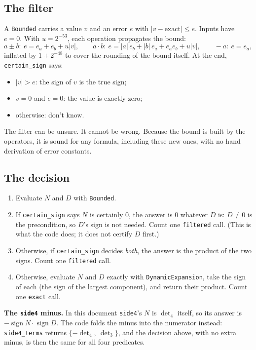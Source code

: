 \documentclass[11pt,a4paper]{article}
\newcommand{\code}[1]{\texttt{#1}}
\newcommand{\sgn}{\operatorname{sign}}
\theoremstyle{remark}
\begin{document}
\subsection{The filter}

A \code{Bounded} carries a value $v$ and an error $e$ with $|v - \text{exact}| \le e$. Inputs
have $e = 0$. With $u = 2^{-53}$, each operation propagates the bound:
\[
  a \pm b:\ e = e_a + e_b + u|v|, \qquad
  a\cdot b:\ e = |a|\,e_b + |b|\,e_a + e_a e_b + u|v|, \qquad
  -a:\ e = e_a,
\]
inflated by $1 + 2^{-48}$ to cover the rounding of the bound itself. At the end,
\code{certain\_sign} says:
\begin{itemize}
  \item $|v| > e$: the sign of $v$ is the true sign;
  \item $v = 0$ and $e = 0$: the value is exactly zero;
  \item otherwise: don't know.
\end{itemize}
The filter can be unsure. It cannot be wrong. Because the bound is built by the operators, it is
sound for any formula, including these new ones, with no hand derivation of error constants.

\subsection{The decision}

\begin{enumerate}
  \item Evaluate $N$ and $D$ with \code{Bounded}.
  \item If \code{certain\_sign} says $N$ is certainly 0, the answer is 0 whatever $D$ is: $D \neq 0$
    is the precondition, so $D$'s sign is not needed. Count one \code{filtered} call. (This is
    what the code does; it does not certify $D$ first.)
  \item Otherwise, if \code{certain\_sign} decides \emph{both}, the answer is the product of the
    two signs. Count one \code{filtered} call.
  \item Otherwise, evaluate $N$ and $D$ exactly with \code{DynamicExpansion}, take the sign of each
    (the sign of the largest component), and return their product. Count one \code{exact} call.
\end{enumerate}
\noindent\textbf{The \code{side4} minus.} In this document \code{side4}'s $N$ is $\det_4$ itself,
so its answer is $-\sgn N\cdot\sgn D$. The code folds the minus into the numerator instead:
\code{side4\_terms} returns $\{-\det_4,\ \det_3\}$, and the decision above, with no extra minus,
is then the same for all four predicates.
\end{document}
